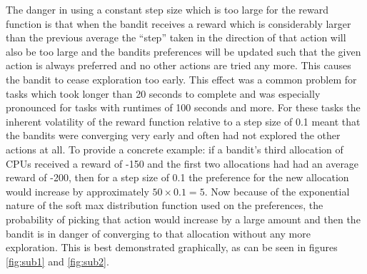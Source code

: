 The danger in using a constant step size which is too large for the reward function is that when the bandit receives a reward which is considerably larger than the previous average the “step” taken in the direction of that action will also be too large and the bandits preferences will be updated such that the given action is always preferred and no other actions are tried any more. This causes the bandit to cease exploration too early. This effect was a common problem for tasks which took longer than 20 seconds to complete and was especially pronounced for tasks with runtimes of 100 seconds and more.  For these tasks the inherent volatility of the reward function relative to a step size of 0.1 meant that the bandits were converging very early and often had not explored the other actions at all. To provide a concrete example: if a bandit’s third allocation of CPUs received a reward of -150 and the first two allocations had had an average reward of -200, then for a step size of 0.1 the preference for the new allocation would increase by approximately $50\times0.1=5$. Now because of the exponential nature of the soft max distribution function used on the preferences, the probability of picking that action would increase by a large amount and then the bandit is in danger of converging to that allocation without any more exploration. This is best demonstrated graphically, as can be seen in figures \ref{fig:sub1} and \ref{fig:sub2}.

